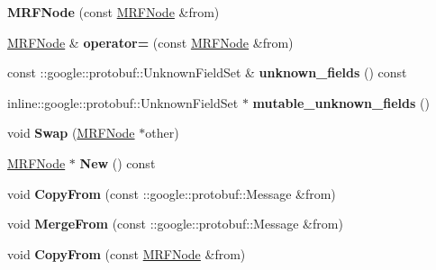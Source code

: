 \begin{DoxyCompactItemize}
\item 
\hypertarget{classgraph_1_1MRFNode_a021b05b80147363c7e6712f48d44a0a3}{
{\bfseries MRFNode} (const \hyperlink{classgraph_1_1MRFNode}{MRFNode} \&from)}
\label{classgraph_1_1MRFNode_a021b05b80147363c7e6712f48d44a0a3}

\item 
\hypertarget{classgraph_1_1MRFNode_a24e99e7e39879fdb7e5ba3457e05f711}{
\hyperlink{classgraph_1_1MRFNode}{MRFNode} \& {\bfseries operator=} (const \hyperlink{classgraph_1_1MRFNode}{MRFNode} \&from)}
\label{classgraph_1_1MRFNode_a24e99e7e39879fdb7e5ba3457e05f711}

\item 
\hypertarget{classgraph_1_1MRFNode_a8716f067ae2c0b732dbe8e808e58c57f}{
const ::google::protobuf::UnknownFieldSet \& {\bfseries unknown\_\-fields} () const }
\label{classgraph_1_1MRFNode_a8716f067ae2c0b732dbe8e808e58c57f}

\item 
\hypertarget{classgraph_1_1MRFNode_abdd95998aa20cc6e28e69768da470c16}{
inline::google::protobuf::UnknownFieldSet $\ast$ {\bfseries mutable\_\-unknown\_\-fields} ()}
\label{classgraph_1_1MRFNode_abdd95998aa20cc6e28e69768da470c16}

\item 
\hypertarget{classgraph_1_1MRFNode_a6dbf7084428bf6caece3fb82097f1944}{
void {\bfseries Swap} (\hyperlink{classgraph_1_1MRFNode}{MRFNode} $\ast$other)}
\label{classgraph_1_1MRFNode_a6dbf7084428bf6caece3fb82097f1944}

\item 
\hypertarget{classgraph_1_1MRFNode_aae86515fdbc1b37e4e0199213ca28d73}{
\hyperlink{classgraph_1_1MRFNode}{MRFNode} $\ast$ {\bfseries New} () const }
\label{classgraph_1_1MRFNode_aae86515fdbc1b37e4e0199213ca28d73}

\item 
\hypertarget{classgraph_1_1MRFNode_a9597eb49cdf67bc0fcbdf2fd80df98ee}{
void {\bfseries CopyFrom} (const ::google::protobuf::Message \&from)}
\label{classgraph_1_1MRFNode_a9597eb49cdf67bc0fcbdf2fd80df98ee}

\item 
\hypertarget{classgraph_1_1MRFNode_a9c35a74300cf3dca0218bcaeab056068}{
void {\bfseries MergeFrom} (const ::google::protobuf::Message \&from)}
\label{classgraph_1_1MRFNode_a9c35a74300cf3dca0218bcaeab056068}

\item 
\hypertarget{classgraph_1_1MRFNode_ab7f56050e7e981a5aea088fc4703a03b}{
void {\bfseries CopyFrom} (const \hyperlink{classgraph_1_1MRFNode}{MRFNode} \&from)}
\label{classgraph_1_1MRFNode_ab7f56050e7e981a5aea088fc4703a03b}


\end{DoxyCompactItemize}
